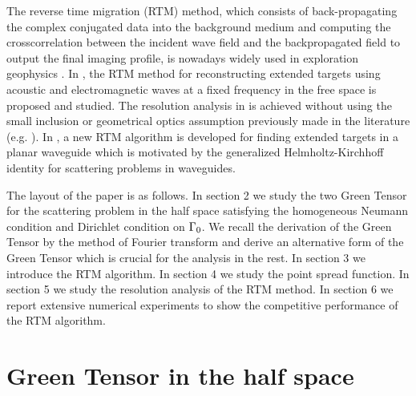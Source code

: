 \documentclass[12pt]{iopart}
\begin{document}
The reverse time migration (RTM) method, which consists of back-propagating
the complex conjugated data into the background medium and computing the crosscorrelation between the incident wave field and the backpropagated field to output the
final imaging profile, is nowadays widely used in exploration geophysics \cite{berkhout2012seismic,bleistein2013mathematics,claerbout1985imaging}. In \cite{chen2013reverse_acou,chen2013reverse_elec},
the RTM method for reconstructing extended targets using acoustic and electromagnetic
waves at a fixed frequency in the free space is proposed and studied. The resolution
analysis in \cite{chen2013reverse_acou,chen2013reverse_elec} is achieved without using the small inclusion or geometrical optics
assumption previously made in the literature (e.g. \cite{ammari2013mathematical,bleistein2013mathematics}). In \cite{chen2015reverse_planar}, a new RTM algorithm
is developed for finding extended targets in a planar waveguide which is motivated by
the generalized Helmholtz-Kirchhoff identity for scattering problems in waveguides.

The layout of the paper is as follows. In section 2 we study the two Green Tensor for
the scattering problem in the half space satisfying the homogeneous Neumann condition and Dirichlet condition on $\Gamma_0$. We recall the derivation of the Green
Tensor by the method of Fourier transform and derive an alternative form of the
Green Tensor which is crucial for the analysis in the rest. In section 3 we introduce the RTM
algorithm. In section 4 we study the point spread function. In section 5 we study
the resolution analysis of the RTM method. In section 6
we report extensive numerical experiments to show the competitive performance of the
RTM algorithm.



\section{Green Tensor in the half space}
\end{document}
